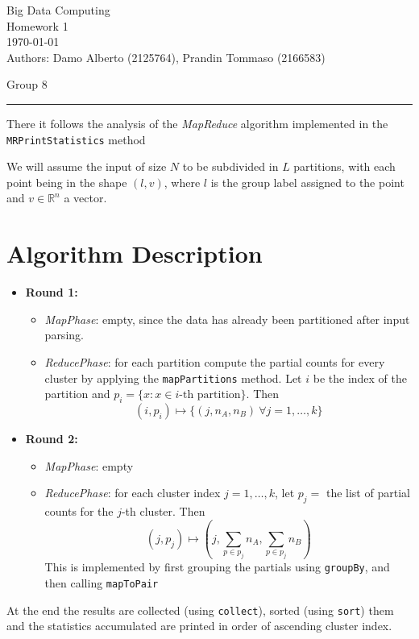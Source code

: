 \documentclass[11pt,letterpaper, onecolumn]{exam}
\begin{document}
\begingroup  
    \centering
    \large Big Data Computing\\
    \large Homework 1\\[0.3em]
    \small \today\\[0.5em]
    \small Authors: Damo Alberto (2125764), Prandin Tommaso (2166583)\par
    \small Group 8\par
\endgroup
\rule{\textwidth}{0.4pt}

There it follows the analysis of the \textit{MapReduce} algorithm implemented in the \texttt{MRPrintStatistics} method

We will assume the input of size $N$ to be subdivided in $L$ partitions, with each point being in the shape $(l, v)$, where $l$ is the group label assigned to the point and $v \in \mathbb{R}^{n}$ a vector.
\section{Algorithm Description}
\begin{itemize}
    \item \textbf{Round 1:}
    \begin{itemize}
        \item \textit{MapPhase}: empty, since the data has already been partitioned after input parsing.
        \item \textit{ReducePhase}: for each partition compute the partial counts for every cluster by applying the \texttt{mapPartitions} method. Let $i$ be the index of the partition and $p_i = \{x : x \in i\text{-th partition}\}$.
        Then
        $$
        (i, p_i) \mapsto \{(j, n_A, n_B)\  \forall j = 1, \dots, k\}
        $$
    \end{itemize}
    \item \textbf{Round 2:}
    \begin{itemize}
        \item \textit{MapPhase}: empty
        \item \textit{ReducePhase}: for each cluster index $j = 1, \dots, k$, let $p_j = $ the list of partial counts for the $j$-th cluster.
        Then
        $$
            (j, p_j) \mapsto (j, \sum_{p \in p_j}n_A, \sum_{p \in p_j}n_B)
        $$
        This is implemented by first grouping the partials using \texttt{groupBy}, and then calling \texttt{mapToPair}
    \end{itemize}
\end{itemize}

At the end the results are collected (using \texttt{collect}), sorted (using \texttt{sort}) them and the statistics accumulated are printed in order of ascending cluster index.
\end{document}
